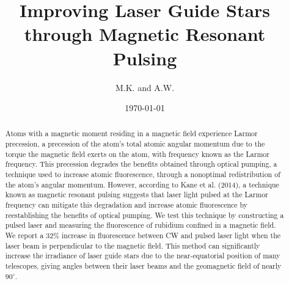 \documentclass[]{revtex4}
\begin{document}
\title{Improving Laser Guide Stars through Magnetic Resonant Pulsing}

\author{M.K. and A.W.}

\date{\today}


\begin{abstract}
Atoms with a magnetic moment residing in a magnetic field experience Larmor precession, a precession of the atom's total atomic angular momentum due to the torque the magnetic field exerts on the atom, with frequency known as the Larmor frequency. This precession degrades the benefits obtained through optical pumping, a technique used to increase atomic fluorescence, through a nonoptimal redistribution of the atom's angular momentum. However, according to Kane et al. (2014), a technique known as magnetic resonant pulsing suggests that laser light pulsed at the Larmor frequency can mitigate this degradation and increase atomic fluorescence by reestablishing the benefits of optical pumping. We test this technique by constructing a pulsed laser and measuring the fluorescence of rubidium confined in a magnetic field. We report a 32\% increase in fluorescence between CW and pulsed laser light when the laser beam is perpendicular to the magnetic field. This method can significantly increase the irradiance of laser guide stars due to the near-equatorial position of many telescopes, giving angles between their laser beams and the geomagnetic field of nearly $90 ^{\circ}$.



\end{abstract}
\end{document}
